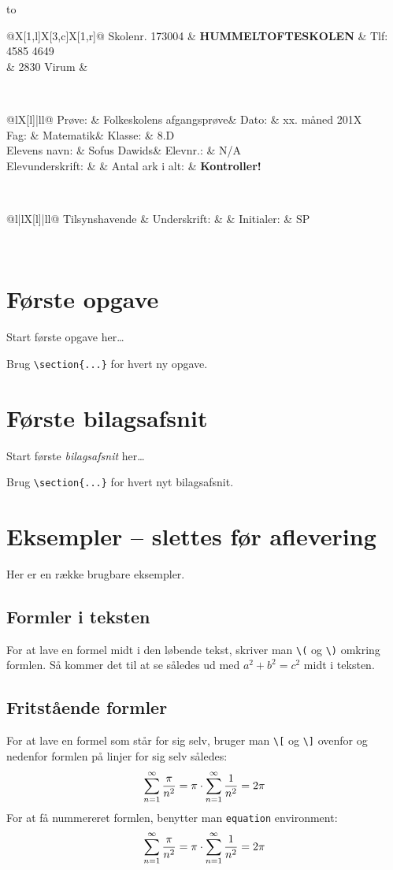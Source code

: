 \documentclass[a4,12pt]{article}
\makeatletter
\numberwithin{equation}{section}
\numberwithin{table}{section}
\numberwithin{figure}{section}
\newcommand{\skoleklasse}{8.D} %
\newcommand{\proevetype}{Folkeskolens afgangsprøve}
\newcommand{\proevefag}{Matematik}
\newcommand{\elevnavn}{Sofus Dawids}
\newcommand{\elevnummer}{N/A} %
\newcommand{\tilsynshavende}{SP} %
\newcommand{\eksamensdato}{xx. måned 201X} %
\newcommand{\antalarkialt}{\pageref*{LastPage} \textbf{Kontroller!}} %
\newcommand{\eksamensforsideboks}{
\begin{tabu} to  \textwidth {|X[c]|}
  \hline
  \begin{tabu} {@{}X[1,l]X[3,c]X[1,r]@{}}
    Skolenr. 173004 & {\large\textbf{\smash[b]{\strut}HUMMELTOFTESKOLEN}} & Tlf: 4585 4649 \\
  & 2830 Virum & \\
  \end{tabu} \\
  \hline
  \begin{tabu} {@{}lX[l]|ll@{}}
    Prøve: & \proevetype & Dato: & \eksamensdato \\
    Fag: & \proevefag & Klasse: & \skoleklasse \\
    Elevens navn: & \elevnavn & Elevnr.: & \elevnummer \\
    Elevunderskrift: & & Antal ark i alt: & \antalarkialt \\[0.5cm]
  \end{tabu} \\
  \hline
  \begin{tabu} {@{}l|lX[l]|ll@{}}
    Tilsynshavende & Underskrift: & & Initialer: & \tilsynshavende \\[0.5cm]
  \end{tabu} \\
  \hline
\end{tabu}
\vspace{1cm}
}
\newcommand*{\tableofcontentsnobreak}{\@starttoc{toc}}
\makeatother
\begin{document}
\thispagestyle{plain}
\eksamensforsideboks

\tableofcontentsnobreak

\section{Første opgave}
Start første opgave her\ldots

Brug \verb$\section{...}$ for hvert ny opgave.

\appendix
\section{Første bilagsafsnit}
Start første \emph{bilagsafsnit} her\ldots

Brug \verb$\section{...}$ for hvert nyt bilagsafsnit.

\section{Eksempler -- slettes før aflevering}
Her er en række brugbare eksempler.

\subsection{Formler i teksten}
For at lave en formel midt i den løbende tekst, skriver man \verb$\($ og \verb$\)$ omkring formlen.
Så kommer det til at se således ud med \( a^2 + b^2 = c^2 \) midt i teksten.

\subsection{Fritstående formler}
For at lave en formel som står for sig selv, bruger man \verb$\[$ og \verb$\]$ ovenfor og nedenfor formlen på linjer for sig selv således:
\[
  \sum\limits_{n=1}^\infty{\pi \over n^2}
    = \pi \cdot \sum\limits_{n=1}^\infty{1 \over n^2}
    = 2\pi
\]
For at få nummereret formlen, benytter man \verb$equation$ environment:
\begin{equation}
  \sum\limits_{n=1}^\infty{\pi \over n^2}
    = \pi \cdot \sum\limits_{n=1}^\infty{1 \over n^2}
    = 2\pi
\end{equation}
\end{document}
